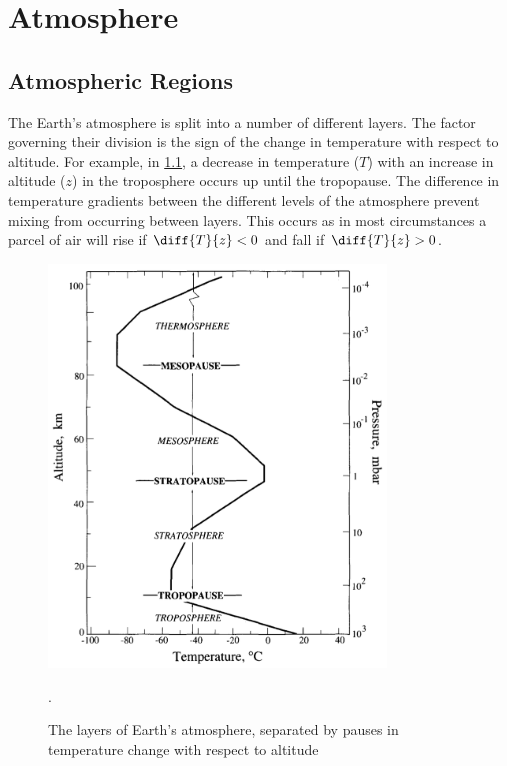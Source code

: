 





\chapter{Atmosphere}
\label{ch:atmo}

\section{Atmospheric Regions}
\label{sec:atmoreg}

The Earth's atmosphere is split into a number of different layers. The factor governing their division is the sign of the change in temperature with respect to altitude. For example, in \cref{fig:atmolay}, a decrease in temperature ($T$) with an increase in altitude ($z$) in the troposphere occurs up until the tropopause. The difference in temperature gradients between the different levels of the atmosphere prevent mixing from occurring between layers. This occurs as in most circumstances a parcel of air will rise if $\diff{T}{z} < 0$ and fall if $\diff{T}{z} > 0$.

	\begin{figure}[!htb]
	 	\centering
	 	\includegraphics[width=0.8\textwidth,natwidth=1004,natheight=1196]{Fig/Atmosphere_Layers.png}
	 	\caption{The layers of Earth's atmosphere, separated by pauses in temperature change with respect to altitude \citep[p. 7]{seinfeld2012atmospheric}}.
	 	\label{fig:atmolay}
	\end{figure}

